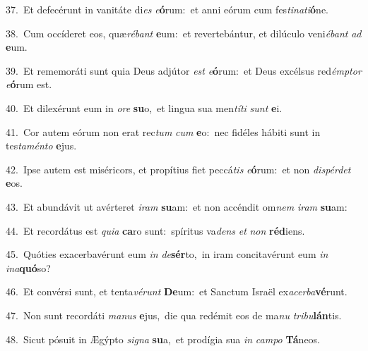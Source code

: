 {\numbfont\textcolor{\numbcolor}{37.}}~Et defecérunt in vanitáte di\textit{es} \textit{e}\-\textbf{ó}rum:~\star et anni eórum cum fes\-\textit{ti}\-\textit{na}\textit{ti}\textbf{ó}ne.\par
{\numbfont\textcolor{\numbcolor}{38.}}~Cum occíderet eos, quæ\-\textit{ré}\-\textit{bant} \textbf{e}\-um:~\star et revertebántur, et dilúculo veni\-\textit{é}\-\textit{bant} \textit{ad} \textbf{e}\-um.\par
{\numbfont\textcolor{\numbcolor}{39.}}~Et rememoráti sunt quia Deus adjútor \textit{est} \textit{e}\-\textbf{ó}rum:~\star et Deus excélsus red\-\textit{émp}\-\textit{tor} \textit{e}\-\textbf{ó}rum est.\par
{\numbfont\textcolor{\numbcolor}{40.}}~Et dilexérunt eum in \textit{o}\-\textit{re} \textbf{su}\-o,~\star et lingua sua men\-\textit{tí}\-\textit{ti} \textit{sunt} \textbf{e}\-i.\par
{\numbfont\textcolor{\numbcolor}{41.}}~Cor autem eórum non erat rec\textit{tum} \textit{cum} \textbf{e}\-o:~\star nec fidéles hábiti sunt in tes\-\textit{ta}\-\textit{mén}\textit{to} \textbf{e}\-jus.\par
{\numbfont\textcolor{\numbcolor}{42.}}~Ipse autem est miséricors, et propítius fiet peccá\textit{tis} \textit{e}\-\textbf{ó}rum:~\star et non \textit{dis}\-\textit{pér}\textit{det} \textbf{e}\-os.\par
{\numbfont\textcolor{\numbcolor}{43.}}~Et abundávit ut avérteret \textit{i}\-\textit{ram} \textbf{su}\-am:~\star et non accéndit om\textit{nem} \textit{i}\-\textit{ram} \textbf{su}\-am:\par
{\numbfont\textcolor{\numbcolor}{44.}}~Et recordátus est \textit{qui}\-\textit{a} \textbf{ca}\-ro sunt:~\star spíritus va\textit{dens} \textit{et} \textit{non} \textbf{réd}\-iens.\par
{\numbfont\textcolor{\numbcolor}{45.}}~Quóties exacerbavérunt eum \textit{in} \textit{de}\-\textbf{sér}to,~\star in iram concitavérunt eum \textit{in} \textit{in}\-\textit{a}\textbf{quó}so?\par
{\numbfont\textcolor{\numbcolor}{46.}}~Et convérsi sunt, et tenta\-\textit{vé}\-\textit{runt} \textbf{De}\-um:~\star et Sanctum Israël ex\-\textit{a}\-\textit{cer}\textit{ba}\textbf{vé}runt.\par
{\numbfont\textcolor{\numbcolor}{47.}}~Non sunt recordáti \textit{ma}\-\textit{nus} \textbf{e}\-jus,~\star die qua redémit eos de ma\textit{nu} \textit{tri}\-\textit{bu}\textbf{lán}tis.\par
{\numbfont\textcolor{\numbcolor}{48.}}~Sicut pósuit in Ægýpto \textit{si}\-\textit{gna} \textbf{su}\-a,~\star et prodígia sua \textit{in} \textit{cam}\-\textit{po} \textbf{Tá}\-neos.\par
